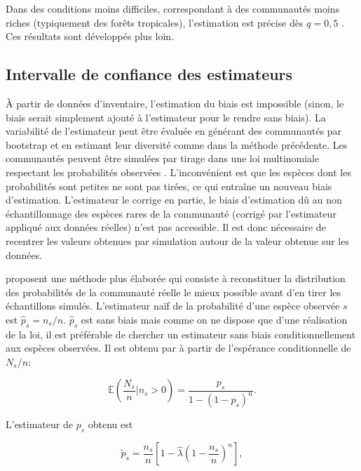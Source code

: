 \documentclass[
  11pt,
  french,
  a4paper,
  extrafontsizes,onecolumn,openright
  ]{memoir}
\begin{document}
Dans des conditions moins difficiles, correspondant à des communautés moins riches (typiquement des forêts tropicales), l'estimation est précise dès \(q=0,5\) \autocite{Marcon2015a}.
Ces résultats sont développés plus loin.

\hypertarget{intervalle-de-confiance-des-estimateurs}{%
\subsection{Intervalle de confiance des estimateurs}\label{intervalle-de-confiance-des-estimateurs}}

À partir de données d'inventaire, l'estimation du biais est impossible (sinon, le biais serait simplement ajouté à l'estimateur pour le rendre sans biais).
La variabilité de l'estimateur peut être évaluée en générant des communautés par bootstrap et en estimant leur diversité comme dans la méthode précédente.
Les communautés peuvent être simulées par tirage dans une loi multinomiale respectant les probabilités observées \autocite{Marcon2012a,Marcon2014a}.
L'inconvénient est que les espèces dont les probabilités sont petites ne sont pas tirées, ce qui entraîne un nouveau biais d'estimation.
L'estimateur le corrige en partie, le biais d'estimation dû au non échantillonnage des espèces rares de la communauté (corrigé par l'estimateur appliqué aux données réelles) n'est pas accessible.
Il est donc nécessaire de recentrer les valeurs obtenues par simulation autour de la valeur obtenue sur les données.

\textcite{Chao2015} proposent une méthode plus élaborée qui consiste à reconstituer la distribution des probabilités de la communauté réelle le mieux possible avant d'en tirer les échantillons simulés.
L'estimateur naïf de la probabilité d'une espèce observée \(s\) est \(\hat{p}_s = {n_s}/{n}\).
\(\hat{p}_s\) est sans biais mais comme on ne dispose que d'une réalisation de la loi, il est préférable de chercher un estimateur sans biais conditionnellement aux espèces observées.
Il est obtenu par \textcite{Chao2013} à partir de l'espérance conditionnelle de \({N_s}/{n}\):

\begin{equation}
  \label{eq:Chao2013ENs}
  {\mathbb E} \left( \frac{N_s}{n} | n_s>0 \right)
  = \frac{p_s}{1-(1-p_s)^n}.
\end{equation}

L'estimateur de \(p_s\) obtenu est

\begin{equation}
  \label{eq:Chao2013ps}
  \tilde{p}_s
  = \frac{n_s}{n} \left[ {1-\hat{\lambda}\left(1-\frac{n_s}{n}\right)^n} \right],
\end{equation}
\end{document}
